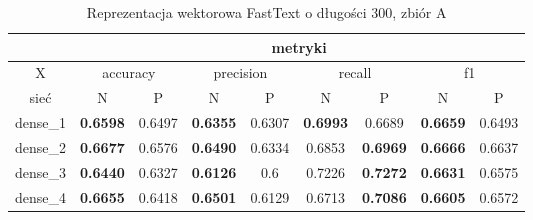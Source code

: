 \begin{table}[p] \centering
    \caption{Reprezentacja wektorowa FastText o długości 300, zbiór A}
    \label{tab:wyniki_fasttext_A}
    \begin{tabular}{|c|c|c|c|c|c|c|c|c|}    \hline

                 & \multicolumn{8}{c|}{metryki}                                                                                                                                                                                                                                                                                  \\ \hline
        X        & \multicolumn{2}{c|}{accuracy}       & \multicolumn{2}{c|}{precision}      & \multicolumn{2}{c|}{recall}         & \multicolumn{2}{c|}{f1}                                                                                                                                                                     \\ \hline
        sieć     & N                                   & P                                   & N                                   & P                                   & N                                   & P                                   & N                                   & P                                   \\ \hline
        dense\_1 & \textbf{0.6598}                     & 0.6497                              & \textbf{0.6355}                     & 0.6307                              & \textbf{0.6993}                     & 0.6689                              & \textbf{0.6659}                     & 0.6493                              \\ \hline
        dense\_2 & \textbf{0.6677}                     & 0.6576                              & \textbf{0.6490}                     & 0.6334                              & 0.6853                              & \textbf{0.6969}                     & \textbf{0.6666}                     & 0.6637                              \\ \hline
        dense\_3 & \textbf{0.6440}                     & 0.6327                              & \textbf{0.6126}                     & 0.6                                 & 0.7226                              & \textbf{0.7272}                     & \textbf{0.6631}                     & 0.6575                              \\ \hline
        dense\_4 & \textbf{0.6655}                     & 0.6418                              & \textbf{0.6501}                     & 0.6129                              & 0.6713                              & \textbf{0.7086}                     & \textbf{0.6605}                     & 0.6572                              \\ \hline

\end{tabular}
\end{table}
